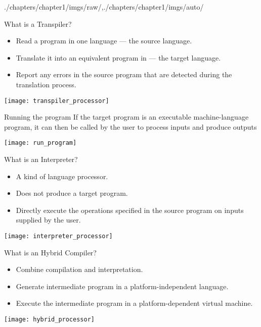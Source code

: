 \begin{graphicspathcontext}{{./chapters/chapter1/imgs/raw/},{./chapters/chapter1/imgs/auto/}}
\begin{bibunit}[apalike]
\begin{frame}{What is a Transpiler?}
	\begin{itemize}
		\item Read a program in one language --- the source language.
		\item Translate it into an equivalent program in  --- the target language.
		\vfill
		\item Report any errors in the source program that are detected during the translation process.
	\end{itemize}
	\vfill
	\begin{center}
		\texttt{[image: transpiler\_processor]}
	\end{center}
\end{frame}

\begin{frame}{Running the program}
	If the target program is an executable machine-language program, it can then be called by the user to process inputs and produce outputs
	\vfill
	\begin{center}
		\texttt{[image: run\_program]}
	\end{center}
\end{frame}

\begin{frame}{What is an Interpreter?}
	\begin{itemize}
	\item A kind of language processor.
	\item Does not produce a target program.
	\item Directly execute the operations specified in the source program on inputs supplied by the user.
	\end{itemize}
	\vfill
	\begin{center}
		\texttt{[image: interpreter\_processor]}
	\end{center}
\end{frame}

\begin{frame}{What is an Hybrid Compiler?}
	\begin{itemize}
	\item Combine compilation and interpretation.
	\item Generate intermediate program in a platform-independent language.
	\item Execute the intermediate program in a platform-dependent virtual machine.
	\end{itemize}
	\vfill
	\begin{center}
		\texttt{[image: hybrid\_processor]}
	\end{center}
\end{frame}


\end{bibunit}
\end{graphicspathcontext}

